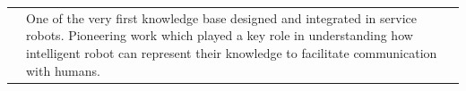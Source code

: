 \documentclass[11pt,a4paper]{report}
\begin{document}
\begin{tabular}{p{1.7cm}p{7cm}p{8cm}}
    & \small One of the very first knowledge base designed and
    integrated in service robots. Pioneering work which played a key role in
    understanding how intelligent robot can represent their
    knowledge to facilitate communication with humans.
    \textbf{}\\

\end{tabular}



%






\newpage



\newpage
\newrefsection
\end{document}
